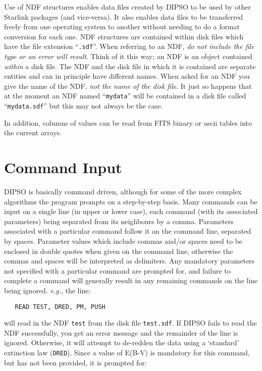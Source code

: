 \documentclass[twoside,11pt]{article}
\newcommand{\htmlref}[2]{#1}
\renewcommand{\_}{\texttt{\symbol{95}}}
\begin{document}
Use of NDF structures enables data files created by DIPSO to be used by
other Starlink packages (and vice-versa). It also enables data files to
be transferred freely from one operating system to another without
needing to do a format conversion for each one. NDF structures are
contained within disk files which have the file extension ``{\tt{.sdf}}''. 
When referring to an NDF, {\em do not include the file type or an error
will result}. Think of it this way; an NDF is an object contained {\em
within} a disk file. The NDF and the disk file in which it is contained
are separate entities and can in principle have different names. When
asked for an NDF you give the name of the NDF, {\em not the name of the
disk file}. It just so happens that at the moment an NDF named
``{\tt{my\_data}}''  will be contained in a disk file called
``{\tt{my\_data.sdf}}''  but this may not always be the case.

In addition, columns of values can be read from FITS binary or ascii
tables into the current arrays.

\section {Command Input}

DIPSO is basically command driven, although for some of the more
complex algorithms the program prompts on a step-by-step basis. Many
commands can be input on a single line (in upper or lower case), each
command (with its associated parameters) being separated from its
neighbours by a comma. Parameters associated with a particular command
follow it on the command line, separated by spaces. Parameter values
which include commas and/or spaces need to be enclosed in double quotes
when given on the command line, otherwise the commas and spaces will be
interpreted as delimiters. Any mandatory
parameters not specified with a particular command are prompted for,
and failure to complete a command will generally result in any
remaining commands on the line being ignored. {\em e.g.}, the line:

\begin{verbatim}
   READ TEST, DRED, PM, PUSH
\end{verbatim}

will read in the NDF {\tt{test}}  from the disk file {\tt{test.sdf}}.  If DIPSO
fails to read the NDF successfully, you get an error message and the remainder
of the line is ignored. Otherwise, it will attempt to de-redden the data using a
`standard' extinction law (\htmlref{{\tt{DRED}}}{COM:DRED}).  Since a value of E(B-V) is mandatory for
this command, but has not been provided, it is prompted for:
\end{document}
